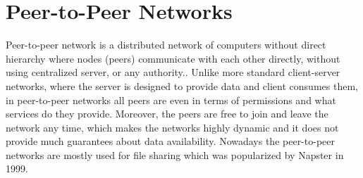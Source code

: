 \section{Peer-to-Peer Networks}
\label{sec:peer-to-peer-networks}
Peer-to-peer network is a distributed network of computers without direct hierarchy where nodes (peers) communicate with each other directly, without using centralized server, or any authority.\cite{schollmeier}.
Unlike more standard client-server networks, where the server is designed to provide data and client consumes them, in peer-to-peer networks all peers are even in terms of permissions and what services do they provide.
Moreover, the peers are free to join and leave the network any time, which makes the networks highly dynamic and it does not provide much guarantees about data availability.
Nowadays the peer-to-peer networks are mostly used for file sharing which was popularized by Napster in 1999\cite{saroiu}.